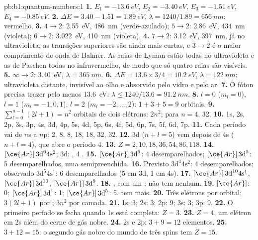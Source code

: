 \begin{solution}{pb:b1:quantum-numbers:1}
\textbf{1.} $E_1 = \qty{-13.6}{eV}$, $E_2 = \qty{-3.40}{eV}$,
$E_3 = \qty{-1.51}{eV}$, $E_4 = \qty{-0.85}{eV}$.
\textbf{2.} $\Delta E = 3.40 - 1.51 = \qty{1.89}{eV}$, $\lambda = 1240/1.89
= \qty{656}{nm}$: vermelho.
\textbf{3.} $4 \to 2$: \qty{2.55}{eV}, \qty{486}{nm} (verde-azulado);
$5 \to 2$: \qty{2.86}{eV}, \qty{434}{nm} (violeta); $6 \to 2$: \qty{3.022}{eV},
\qty{410}{nm} (violeta).
\textbf{4.} $7 \to 2$: \qty{3.12}{eV}, \qty{397}{nm}, já no ultravioleta;
as transições superiores são ainda mais curtas, e $3 \to 2$ é o maior
comprimento de onda de Balmer. As raias de Lyman estão todas no
ultravioleta e as de Paschen todas no infravermelho, de modo que só
quatro raias são visíveis.
\textbf{5.} $\infty \to 2$: \qty{3.40}{eV}, $\lambda = \qty{365}{nm}$.
\textbf{6.} $\Delta E = 13.6 \times 3/4 = \qty{10.2}{eV}$, $\lambda =
\qty{122}{nm}$: ultravioleta distante, invisível ao olho e absorvido
pelo vidro e pelo ar.
\textbf{7.} O fóton precisa trazer pelo menos \qty{13.6}{eV}: $\lambda \le
1240/13.6 = \qty{91.2}{nm}$.
\textbf{8.} $l = 0$ ($m_l = 0$), $l = 1$ ($m_l = -1, 0, 1$), $l = 2$
($m_l = -2, \dots, 2$): $1 + 3 + 5 = 9$ orbitais.
\textbf{9.} $\sum_{l=0}^{n-1}(2l+1) = n^2$ orbitais de dois elétrons:
$2n^2$; para $n = 4$, 32.
\textbf{10.} 1s, 2s, 2p, 3s, 3p, 4s, 3d, 4p, 5s, 4d, 5p, 6s, 4f, 5d, 6p,
7s, 5f, 6d, 7p.
\textbf{11.} Cada período vai de $n$s a $n$p: 2, 8, 8, 18, 18, 32, 32.
\textbf{12.} 3d ($n + l = 5$) vem depois de 4s ($n + l = 4$), que abre o
período 4.
\textbf{13.} $Z = 2, 10, 18, 36, 54, 86, 118$.
\textbf{14.} $[\ce{Ar}]\,3\text{d}^6 4\text{s}^2$; 3d: ,
4 .
\textbf{15.}  $[\ce{Ar}]\,3\text{d}^6$: 4 desemparelhados;
 $[\ce{Ar}]\,3\text{d}^5$: 5 desemparelhados, uma  semipreenchida.
\textbf{16.} Previsto $3\text{d}^4 4\text{s}^2$: 4 desemparelhados; observado
$3\text{d}^5 4\text{s}^1$: 6 desemparelhados (5 em 3d, 1 em 4s).
\textbf{17.}  $[\ce{Ar}]\,3\text{d}^{10} 4\text{s}^1$, 
$[\ce{Ar}]\,3\text{d}^{10}$,  $[\ce{Ar}]\,3\text{d}^9$.
\textbf{18.} , com um ;  não tem nenhum.
\textbf{19.}  $[\ce{Ar}]$: 0;  $[\ce{Ar}]\,3\text{d}^1$:
1;  $[\ce{Ar}]\,3\text{d}^5$: 5.  tem mais.
\textbf{20.} Três elétrons por orbital; $3(2l + 1)$ por ;
$3n^2$ por camada.
\textbf{21.} 1s: 3; 2s: 3; 2p: 9; 3s: 3; 3p: 9.
\textbf{22.} O primeiro período se fecha quando 1s está completa: $Z = 3$.
\textbf{23.} $Z = 4$, um elétron em 2s além do cerne de gás nobre.
\textbf{24.} 2s e 2p: $3 + 9 = 12$ elementos.
\textbf{25.} $3 + 12 = 15$: o segundo gás nobre do mundo de três spins
tem \textbf{$Z = 15$}.
\end{solution}

